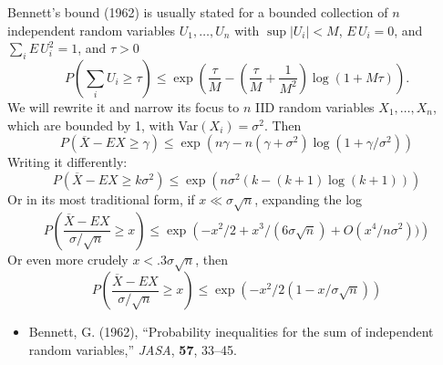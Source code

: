 \documentclass{article}
\begin{document}
Bennett's bound (1962) is usually stated for a bounded collection of
 $n$ independent random variables $U_1, \ldots, U_n$ with $\sup |U_i|
 < M$, $E\,U_i=0$, and $\sum_i E\,U_i^2 = 1$, and $\tau >0$
\begin{displaymath}
  P(\sum_i U_i \ge \tau) 
   \le  \exp\left( 
      \frac{\tau}{M} -
      \left(\frac{\tau}{M}+\frac{1}{M^2}\right)\log(1+M\tau)
    \right).
\end{displaymath}
We will rewrite it and narrow its focus to $n$ IID random variables
 $X_1,\ldots,X_n$, which are bounded by 1, with Var$(X_i) =
\sigma^2$.   Then
\begin{displaymath}
  P(\overline{X} - EX \ge \gamma) 
   \le  \exp\left(n\gamma -
        n(\gamma + \sigma^2)\log(1+\gamma/\sigma^2)\right) 
\end{displaymath}
Writing it differently:
\begin{displaymath}
  P(\overline{X} - EX \ge k\sigma^2) 
   \le  \exp\left(n \sigma^2(k - (k+1)\log(k+1))
    \right) 
\end{displaymath}
Or in its most traditional form, if $x \ll \sigma\sqrt{n}$, 
expanding the log
\begin{displaymath}
  P\left(\frac{\overline{X} - EX}{\sigma/\sqrt{n}}  \ge x\right)
   \le  \exp\left(-x^2/2 + x^3/(6\sigma\sqrt{n}) + O(x^4/n\sigma^2))
    \right) 
\end{displaymath}
Or even more crudely $x < .3 \sigma\sqrt{n}$, then
\begin{displaymath}
  P\left(\frac{\overline{X} - EX}{\sigma/\sqrt{n}}  \ge x\right)
   \le  \exp\left(-x^2/2(1 - x/\sigma\sqrt{n})\right)
\end{displaymath}


\begin{itemize}
\item Bennett, G. (1962), ``Probability inequalities for the sum of
  independent random variables,'' {\it JASA}, {\bf 57}, 33--45.
\end{itemize}
\end{document}
